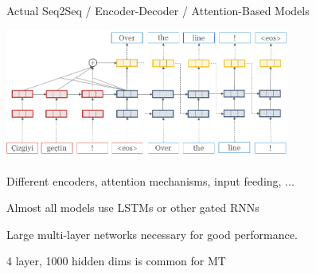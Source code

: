 \documentclass{beamer}
\let\tempone\itemize
\let\temptwo\enditemize
\renewenvironment{itemize}{\tempone\addtolength{\itemsep}{0.5\baselineskip}}{\temptwo}
\newcommand{\air}{\vspace{0.25cm}}
\newcommand{\cvec}{\mathbf{c}}
\begin{document}
\begin{frame}
  \begin{center}
    Actual Seq2Seq / Encoder-Decoder / Attention-Based Models
  \end{center}
    \begin{center}
      \includegraphics[width=0.7\textwidth]{simple-attn}
    \end{center}
  \begin{itemize}
  \item Different encoders, attention mechanisms, input feeding, ...
    \air
  \item Almost all models use LSTMs or other gated RNNs 
    \air
  \item Large multi-layer networks  necessary for good performance.
    \begin{itemize}
    \item 4 layer, 1000 hidden dims is common for MT
    \end{itemize}
  \end{itemize}
\end{frame}
\end{document}
